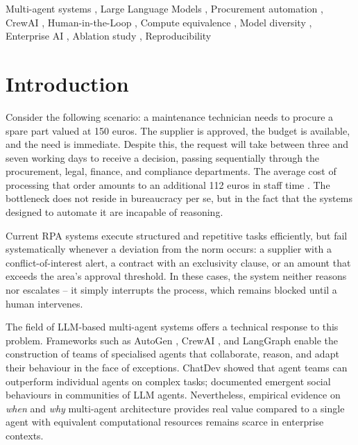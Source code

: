 \documentclass[preprint,12pt,authoryear]{elsarticle}
\begin{document}
\begin{frontmatter}
\begin{keyword}
Multi-agent systems \sep
Large Language Models \sep
Procurement automation \sep
CrewAI \sep
Human-in-the-Loop \sep
Compute equivalence \sep
Model diversity \sep
Enterprise AI \sep
Ablation study \sep
Reproducibility
\end{keyword}

\end{frontmatter}

\section{Introduction}
\label{sec:introduction}

Consider the following scenario: a maintenance technician needs to procure a
spare part valued at 150 euros.
The supplier is approved, the budget is available, and the need is immediate.
Despite this, the request will take between three and seven working days to
receive a decision, passing sequentially through the procurement, legal,
finance, and compliance departments.
The average cost of processing that order amounts to an additional 112 euros in
staff time \citep{hackett2023}.
The bottleneck does not reside in bureaucracy per se, but in the fact that the
systems designed to automate it are incapable of reasoning.

Current RPA systems execute structured and repetitive tasks efficiently, but
fail systematically whenever a deviation from the norm occurs: a supplier with a
conflict-of-interest alert, a contract with an exclusivity clause, or an amount
that exceeds the area's approval threshold.
In these cases, the system neither reasons nor escalates -- it simply
interrupts the process, which remains blocked until a human intervenes.

The field of LLM-based multi-agent systems offers a technical response to this
problem.
Frameworks such as AutoGen \citep{wu2023autogen}, CrewAI \citep{crewai2024},
and LangGraph enable the construction of teams of specialised agents that
collaborate, reason, and adapt their behaviour in the face of exceptions.
ChatDev \citep{qian2023chatdev} showed that agent teams can outperform
individual agents on complex tasks; \citet{park2023generative} documented
emergent social behaviours in communities of LLM agents.
Nevertheless, empirical evidence on \emph{when} and \emph{why} multi-agent
architecture provides real value compared to a single agent with equivalent
computational resources remains scarce in enterprise contexts.
\end{document}
